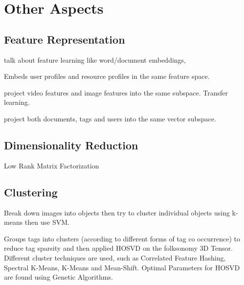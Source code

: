 \section{Other Aspects}\label{section:other_aspects}

\subsection{Feature Representation}

talk about feature learning like word/document embeddings, 

\cite{tatu_etal_2008} Embeds user profiles and resource profiles in the same feature space.

\cite{han_etal_2010} project video features and image features into the same subspace. Transfer learning.

\cite{kataria_agarwal_2015} project both documents, tags and users into the same vector subspace.

\subsection{Dimensionality Reduction}

\cite{song_etal_2008} Low Rank Matrix Factorization









\subsection{Clustering}

\cite{nikolopoulos_etal_2009} Break down images into objects then try to cluster individual objects using k-means then use SVM.

\cite{leginus_etal_2012} Groups tags into clusters (according to different forms of tag co occurrence) to reduce tag sparsity and then applied HOSVD on the folksonomy 3D Tensor.
Different cluster techniques are used, such as Correlated Feature Hashing, Spectral K-Means, K-Means and Mean-Shift. Optimal Parameters for HOSVD are found using Genetic Algorithms.



